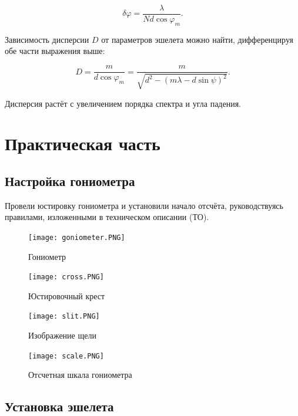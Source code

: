 \documentclass[a4paper,12pt]{article} %
\begin{document}
\[ \delta\varphi=\frac{\lambda}{Nd\cos{\varphi_m}}. \]

Зависимость дисперсии $D$ от параметров эшелета можно найти, дифференцируя обе части выражения выше:

\[ D=\frac{m}{d\cos{\varphi_m}}=\frac{m}{\sqrt{d^2-(m\lambda-d\sin{\psi})^2}}. \]

Дисперсия растёт с увеличением порядка спектра и угла падения.

\newpage

\section{Практическая часть}

\subsection{Настройка гониометра}

Провели юстировку гониометра и установили начало отсчёта, руководствуясь правилами, изложенными в техническом описании (ТО).

\begin{figure}[h]
\begin{center}
\begin{minipage}[h]{0.4\linewidth}
    \texttt{[image: goniometer.PNG]}
    \caption{Гониометр} %
    \label{ris:experimoriginal} %
\end{minipage}
\hfill
\begin{minipage}[h]{0.4\linewidth}
    \texttt{[image: cross.PNG]}
    \caption{Юстировочный крест}
    \label{ris:experimcoded}
\end{minipage}
\vfill
\begin{minipage}[h]{0.4\linewidth}
    \texttt{[image: slit.PNG]}
    \caption{Изображение щели}
    \label{ris:experimcoded}
\end{minipage}
\hfill
\begin{minipage}[h]{0.4\linewidth}
    \texttt{[image: scale.PNG]}
    \caption{Отсчетная шкала гониометра}
    \label{ris:experimcoded}
\end{minipage}
\end{center}
\end{figure}

\subsection{Установка эшелета}
\end{document}
